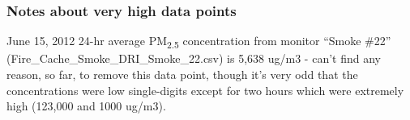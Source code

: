 \begin{enumerate}[nolistsep]


\end{enumerate}

\subsubsection{Notes about very high data points}

June 15, 2012 24-hr average PM\textsubscript{2.5} concentration from monitor ``Smoke \#22'' (Fire\_Cache\_Smoke\_DRI\_Smoke\_22.csv) is 5,638 ug/m3 - can't find any reason, so far, to remove this data point, though it's very odd that the concentrations were low single-digits except for two hours which were extremely high (123,000 and 1000 ug/m3).



